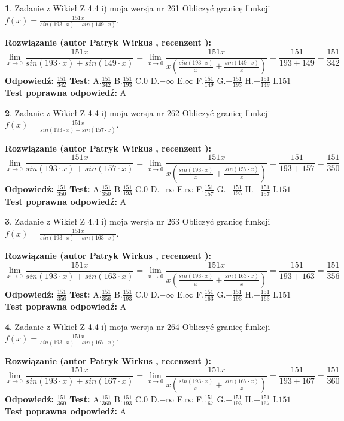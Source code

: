 \documentclass[12pt, a4paper]{article}
\theoremstyle{definition} %
\newtheorem{zad}{}
\newcommand{\zadStart}[1]{\begin{zad}#1\newline}
\newcommand{\zadStop}{\end{zad}}
\newcommand{\rozwStart}[2]{\noindent \textbf{Rozwiązanie (autor #1 , recenzent #2): }\newline}
\newcommand{\rozwStop}{\newline}
\newcommand{\odpStart}{\noindent \textbf{Odpowiedź:}\newline}
\newcommand{\odpStop}{\newline}
\newcommand{\testStart}{\noindent \textbf{Test:}\newline}
\newcommand{\testStop}{\newline}
\newcommand{\kluczStart}{\noindent \textbf{Test poprawna odpowiedź:}\newline}
\newcommand{\kluczStop}{\newline}
\begin{document}
\zadStart{Zadanie z Wikieł Z 4.4 i) moja wersja nr 261}
Obliczyć granicę funkcji $f(x)=\frac{151x}{sin(193\cdot x) +sin(149\cdot x)}$.
\zadStop
\rozwStart{Patryk Wirkus}{}
$$\lim\limits_{x\to 0}\frac{151x}{sin(193\cdot x) +sin(149\cdot x)}=\lim\limits_{x\to 0}\frac{151x}{x(\frac{sin(193\cdot x)}{x}+\frac{sin(149\cdot x)}{x})}=\frac{151}{193+149} = \frac{151}{342}$$
\rozwStop
\odpStart
$\frac{151}{342}$
\odpStop
\testStart
A.$\frac{151}{342}$
B.$\frac{151}{193}$
C.$0$
D.$-\infty$
E.$\infty$
F.$\frac{151}{149}$
G.$-\frac{151}{193}$
H.$-\frac{151}{149}$
I.$151$
\testStop
\kluczStart
A
\kluczStop



\zadStart{Zadanie z Wikieł Z 4.4 i) moja wersja nr 262}
Obliczyć granicę funkcji $f(x)=\frac{151x}{sin(193\cdot x) +sin(157\cdot x)}$.
\zadStop
\rozwStart{Patryk Wirkus}{}
$$\lim\limits_{x\to 0}\frac{151x}{sin(193\cdot x) +sin(157\cdot x)}=\lim\limits_{x\to 0}\frac{151x}{x(\frac{sin(193\cdot x)}{x}+\frac{sin(157\cdot x)}{x})}=\frac{151}{193+157} = \frac{151}{350}$$
\rozwStop
\odpStart
$\frac{151}{350}$
\odpStop
\testStart
A.$\frac{151}{350}$
B.$\frac{151}{193}$
C.$0$
D.$-\infty$
E.$\infty$
F.$\frac{151}{157}$
G.$-\frac{151}{193}$
H.$-\frac{151}{157}$
I.$151$
\testStop
\kluczStart
A
\kluczStop



\zadStart{Zadanie z Wikieł Z 4.4 i) moja wersja nr 263}
Obliczyć granicę funkcji $f(x)=\frac{151x}{sin(193\cdot x) +sin(163\cdot x)}$.
\zadStop
\rozwStart{Patryk Wirkus}{}
$$\lim\limits_{x\to 0}\frac{151x}{sin(193\cdot x) +sin(163\cdot x)}=\lim\limits_{x\to 0}\frac{151x}{x(\frac{sin(193\cdot x)}{x}+\frac{sin(163\cdot x)}{x})}=\frac{151}{193+163} = \frac{151}{356}$$
\rozwStop
\odpStart
$\frac{151}{356}$
\odpStop
\testStart
A.$\frac{151}{356}$
B.$\frac{151}{193}$
C.$0$
D.$-\infty$
E.$\infty$
F.$\frac{151}{163}$
G.$-\frac{151}{193}$
H.$-\frac{151}{163}$
I.$151$
\testStop
\kluczStart
A
\kluczStop



\zadStart{Zadanie z Wikieł Z 4.4 i) moja wersja nr 264}
Obliczyć granicę funkcji $f(x)=\frac{151x}{sin(193\cdot x) +sin(167\cdot x)}$.
\zadStop
\rozwStart{Patryk Wirkus}{}
$$\lim\limits_{x\to 0}\frac{151x}{sin(193\cdot x) +sin(167\cdot x)}=\lim\limits_{x\to 0}\frac{151x}{x(\frac{sin(193\cdot x)}{x}+\frac{sin(167\cdot x)}{x})}=\frac{151}{193+167} = \frac{151}{360}$$
\rozwStop
\odpStart
$\frac{151}{360}$
\odpStop
\testStart
A.$\frac{151}{360}$
B.$\frac{151}{193}$
C.$0$
D.$-\infty$
E.$\infty$
F.$\frac{151}{167}$
G.$-\frac{151}{193}$
H.$-\frac{151}{167}$
I.$151$
\testStop
\kluczStart
A
\kluczStop
\end{document}
